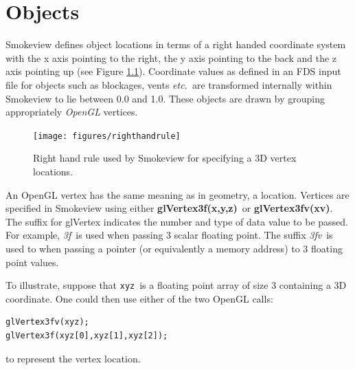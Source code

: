 \documentclass[11pt,twoside]{book}
\begin{document}
\chapter{Objects} Smokeview defines object locations in terms of a right handed coordinate system with the x axis pointing to the right, the y axis pointing to the back and the z axis pointing up (see Figure \ref{figrighthand}).  Coordinate values as defined in an FDS input file for objects such as blockages, vents {\em etc.}\ are transformed internally within Smokeview to lie between 0.0 and 1.0.
These objects are drawn by grouping appropriately {\em OpenGL} vertices.
\begin{figure}[t]
\begin{center}
\texttt{[image: figures/righthandrule]}
\end{center}
\caption{Right hand rule used by Smokeview for specifying a 3D vertex locations.}
\label{figrighthand}
\end{figure}

An OpenGL vertex has the same meaning as in geometry, a location.
Vertices are specified in Smokeview using either {\bf glVertex3f(x,y,z)}\ or {\bf glVertex3fv(xv)}.  The suffix for glVertex indicates the number and type of data value to be passed.  For example, {\em 3f}\ is used when passing 3 scalar floating point.  The suffix {\em 3fv}\ is used to when passing a pointer (or equivalently a memory address) to 3 floating point  values.

To illustrate, suppose that {\tt xyz}\ is a floating point array of size 3 containing a 3D coordinate.  One could then use either of the two OpenGL calls:
\begin{verbatim}
glVertex3fv(xyz);
glVertex3f(xyz[0],xyz[1],xyz[2]);
\end{verbatim}
to represent the vertex location.
\end{document}
